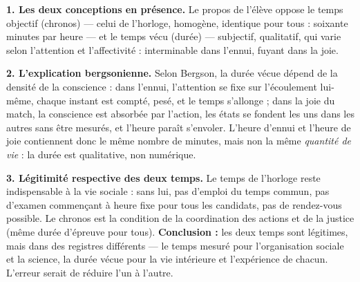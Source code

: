 \documentclass[11pt]{article}
\newcommand{\cle}[1]{{\popxbold\color{popdark}#1}}
\begin{document}
\begin{corrige}

\textbf{1. Les deux conceptions en présence.} Le propos de l'élève oppose le \cle{temps objectif} (chronos) — celui de l'horloge, homogène, identique pour tous : soixante minutes par heure — et le \cle{temps vécu} (durée) — subjectif, qualitatif, qui varie selon l'attention et l'affectivité : interminable dans l'ennui, fuyant dans la joie.

\textbf{2. L'explication bergsonienne.} Selon Bergson, la durée vécue dépend de la densité de la conscience : dans l'ennui, l'attention se fixe sur l'écoulement lui-même, chaque instant est compté, pesé, et le temps s'allonge ; dans la joie du match, la conscience est absorbée par l'action, les états se fondent les uns dans les autres sans être mesurés, et l'heure paraît s'envoler. L'heure d'ennui et l'heure de joie contiennent donc le même nombre de minutes, mais non la même \emph{quantité de vie} : la durée est qualitative, non numérique.

\textbf{3. Légitimité respective des deux temps.} Le temps de l'horloge reste indispensable à la vie sociale : sans lui, pas d'emploi du temps commun, pas d'examen commençant à heure fixe pour tous les candidats, pas de rendez-vous possible. Le chronos est la condition de la coordination des actions et de la justice (même durée d'épreuve pour tous). \textbf{Conclusion :} les deux temps sont légitimes, mais dans des registres différents — le temps mesuré pour l'organisation sociale et la science, la durée vécue pour la vie intérieure et l'expérience de chacun. L'erreur serait de réduire l'un à l'autre.
\end{corrige}
\end{document}

